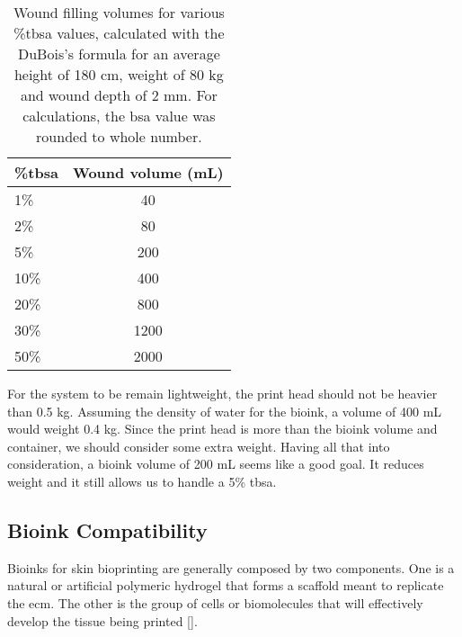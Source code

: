 \begin{table}[ht]
	\caption{Wound filling volumes for various \%\gls{tbsa} values, calculated with the DuBois's formula for an average height of 180 cm, weight of 80 kg and wound depth of 2 \si{\milli\meter}. For calculations, the \gls{bsa} value was rounded to whole number.}
	\label{tab:system_architecture_requirements_wound_volumes}
\centering
\begin{tabular}{lc}
	\toprule
	\textbf{\%\gls{tbsa}} & \textbf{Wound volume (\si{\milli\liter})}\\
	\midrule

    1\% & 40 \\
    2\% & 80 \\
    5\% & 200 \\
    10\% & 400 \\
    20\% & 800 \\
    30\% & 1200 \\
    50\% & 2000 \\
    \bottomrule
\end{tabular}
\end{table}

For the system to be remain lightweight, the print head should not be heavier than 0.5 \si{\kilo\gram}. Assuming the density of water for the bioink, a volume of 400 \si{\milli\liter} would weight 0.4 \si{\kilo\gram}. Since the print head is more than the bioink volume and container, we should consider some extra weight. Having all that into consideration, a bioink volume of 200 \si{\milli\liter} seems like a good goal. It reduces weight and it still allows us to handle a 5\% \gls{tbsa}.


\subsection{Bioink Compatibility}
\label{subsec:system_architecture_requirements_bioprinting_bioink_compatibility}

Bioinks for skin bioprinting are generally composed by two components. One is a natural or artificial polymeric hydrogel that forms a scaffold meant to replicate the \gls{ecm}. The other is the group of cells or biomolecules that will effectively develop the tissue being printed [\cite{Vijayavenkataraman2016_stateart_modelling_materials_processing, Yan2018_3dprinting_skin_tissue_preprocessing_final_eval, Tarassoli2018_skin_tissue_engineering_3dbioprinting_evolving_research_field}].

